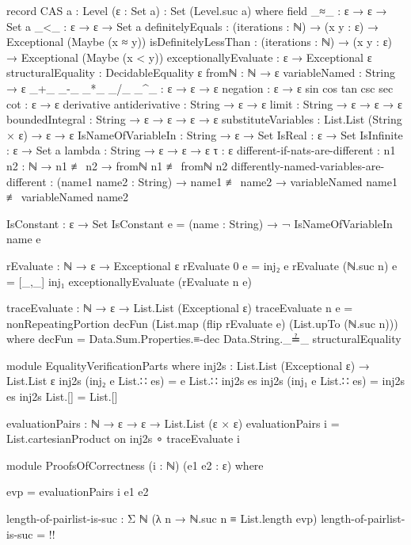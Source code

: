 \documentclass{report}
\begin{document}
\begin{code}
record CAS {a : Level} (ε : Set a) : Set (Level.suc a) where
  field
    _≈_ : ε → ε → Set a
    _<_ : ε → ε → Set a
    definitelyEquals : (iterations : ℕ) →
                       (x y : ε) →
                       Exceptional (Maybe (x ≈ y))
    isDefinitelyLessThan : (iterations : ℕ) →
                           (x y : ε) →
                           Exceptional (Maybe (x < y))
    exceptionallyEvaluate : ε → Exceptional ε
    structuralEquality : DecidableEquality ε
    fromℕ : ℕ → ε
    variableNamed : String → ε
    _+_
     _-_
     _*_
     _/_
     _^_ : ε → ε → ε
    negation : ε → ε
    sin
     cos
     tan
     csc
     sec
     cot : ε → ε
    derivative
     antiderivative : String → ε → ε
    limit : String → ε → ε → ε
    boundedIntegral : String → ε → ε → ε → ε
    substituteVariables : List.List (String × ε) → ε → ε
    IsNameOfVariableIn : String → ε → Set
    IsReal : ε → Set
    IsInfinite : ε → Set a
    lambda : String → ε → ε → ε
    τ : ε
    different-if-nats-are-different :
      {n1 n2 : ℕ} → n1 ≢ n2 → fromℕ n1 ≢ fromℕ n2
    differently-named-variables-are-different :
      (name1 name2 : String) →
      name1 ≢ name2 →
      variableNamed name1 ≢ variableNamed name2

  IsConstant : ε → Set
  IsConstant e = (name : String) → ¬ IsNameOfVariableIn name e

  rEvaluate : ℕ → ε → Exceptional ε
  rEvaluate 0 e = inj₂ e
  rEvaluate (ℕ.suc n) e = [_,_] inj₁ exceptionallyEvaluate (rEvaluate n e)

  traceEvaluate : ℕ → ε → List.List (Exceptional ε)
  traceEvaluate n e =
    nonRepeatingPortion decFun (List.map (flip rEvaluate e) (List.upTo (ℕ.suc n)))
      where decFun = Data.Sum.Properties.≡-dec Data.String._≟_ structuralEquality

  module EqualityVerificationParts where
    inj2s : List.List (Exceptional ε) → List.List ε
    inj2s (inj₂ e List.∷ es) = e List.∷ inj2s es
    inj2s (inj₁ e List.∷ es) = inj2s es
    inj2s List.[] = List.[]

    evaluationPairs : ℕ → ε → ε → List.List (ε × ε)
    evaluationPairs i = List.cartesianProduct on inj2s ∘ traceEvaluate i

    module ProofsOfCorrectness
      (i : ℕ)
      (e1 e2 : ε) where

      evp = evaluationPairs i e1 e2

      length-of-pairlist-is-suc : Σ ℕ (λ n → ℕ.suc n ≡ List.length evp)
      length-of-pairlist-is-suc = {!!}


\end{code}
\end{document}
